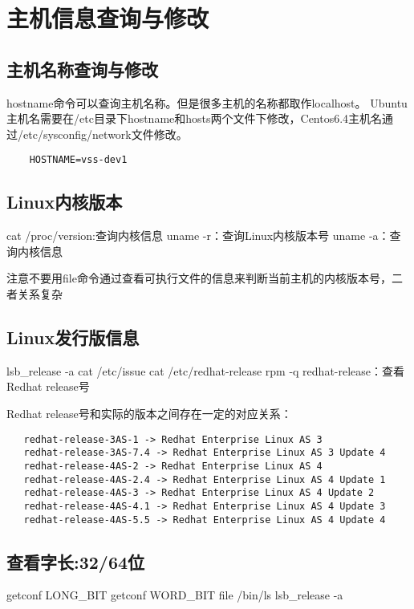 \section{主机信息查询与修改}

\subsection{主机名称查询与修改}
hostname命令可以查询主机名称。但是很多主机的名称都取作localhost。
Ubuntu主机名需要在/etc目录下hostname和hosts两个文件下修改，Centos6.4主机名通过/etc/sysconfig/network文件修改。

\begin{lstlisting}
	HOSTNAME=vss-dev1   
\end{lstlisting}


\subsection{Linux内核版本}
\begin{shellcmd}
cat /proc/version:查询内核信息
uname -r：查询Linux内核版本号
uname -a：查询内核信息
\end{shellcmd}
注意不要用file命令通过查看可执行文件的信息来判断当前主机的内核版本号，二者关系复杂
\subsection*{Linux发行版信息}
\begin{shellcmd}
lsb_release -a 
cat /etc/issue
cat /etc/redhat-release
rpm -q redhat-release：查看Redhat release号
\end{shellcmd}
Redhat release号和实际的版本之间存在一定的对应关系：
\begin{verbatim}
   redhat-release-3AS-1 -> Redhat Enterprise Linux AS 3
   redhat-release-3AS-7.4 -> Redhat Enterprise Linux AS 3 Update 4
   redhat-release-4AS-2 -> Redhat Enterprise Linux AS 4
   redhat-release-4AS-2.4 -> Redhat Enterprise Linux AS 4 Update 1
   redhat-release-4AS-3 -> Redhat Enterprise Linux AS 4 Update 2
   redhat-release-4AS-4.1 -> Redhat Enterprise Linux AS 4 Update 3
   redhat-release-4AS-5.5 -> Redhat Enterprise Linux AS 4 Update 4 
\end{verbatim} 

\subsection*{查看字长:32/64位}
\begin{shellcmd}
getconf LONG_BIT
getconf WORD_BIT
file /bin/ls
lsb_release -a
\end{shellcmd}

